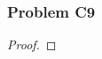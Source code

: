 \documentclass[../../../main.tex]{subfiles}
\begin{document}
\subsubsection{Problem C9}
\begin{wts}

\end{wts}
\begin{proof}

\end{proof}
\end{document}
